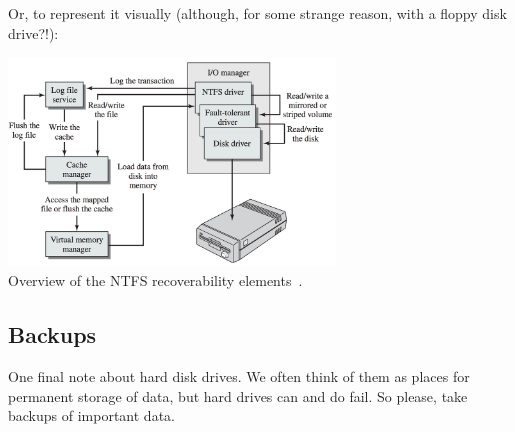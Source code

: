 Or, to represent it visually (although, for some strange reason, with a floppy disk drive?!):

\begin{center}
	\includegraphics[width=0.65\textwidth]{images/ntfs-overview.png}\\
	Overview of the NTFS recoverability elements~\cite{osi}.
\end{center}

\subsection*{Backups}

One final note about hard disk drives. We often think of them as places for permanent storage of data, but hard drives can and do fail. So please, take backups of important data.


